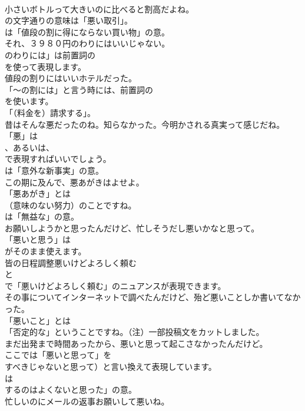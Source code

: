 \documentclass[8pt]{extreport}
\begin{document}
\begin{CJK}{UTF8}{min}
\\	小さいボトルって大きいのに比べると割高だよね。 
\\	の文字通りの意味は「悪い取引」。
\\	は「値段の割に得にならない買い物」の意。	
\\	それ、３９８０円のわりにはいいじゃない。 
\\	のわりには」は前置詞の
\\	を使って表現します。	
\\	値段の割りにはいいホテルだった。 
\\	「～の割には」と言う時には、前置詞の
\\	を使います。
\\	「（料金を）請求する」。	
\\	昔はそんな悪だったのね。知らなかった。今明かされる真実って感じだね。 
\\	「悪」は 
\\	、あるいは、
\\	で表現すればいいでしょう。
\\	は「意外な新事実」の意。	
\\	この期に及んで、悪あがきはよせよ。 
\\	「悪あがき」とは
\\	（意味のない努力）のことですね。
\\	は「無益な」の意。	
\\	お願いしようかと思ったんだけど、忙しそうだし悪いかなと思って。 
\\	「悪いと思う」は
\\	がそのまま使えます。	
\\	皆の日程調整悪いけどよろしく頼む 
\\	と
\\	で「悪いけどよろしく頼む」のニュアンスが表現できます。	
\\	その事についてインターネットで調べたんだけど、殆ど悪いことしか書いてなかった。 
\\	「悪いこと」とは
\\	「否定的な」ということですね。（注）一部投稿文をカットしました。	
\\	まだ出発まで時間あったから、悪いと思って起こさなかったんだけど。 
\\	ここでは「悪いと思って」を
\\	すべきじゃないと思って）と言い換えて表現しています。
\\	は
\\	するのはよくないと思った」の意。	
\\	忙しいのにメールの返事お願いして悪いね。 

\end{CJK}
\end{document}
